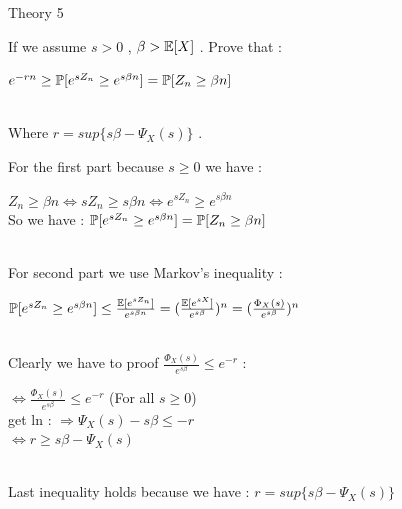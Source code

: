 \documentclass[30pt]{article}
\begin{document}
{\Large \color{blue} Theory 5 } \\
{\color{blue} If we assume $s > 0 $ , $\beta > \Bbb{E}[X] $ . Prove that : \\
\begin{center}
    $ e^{-rn} \ge \Bbb{P}[e^{sZ_n} \ge e^{s\beta n}] = \Bbb{P}[Z_n \ge \beta n] $
\end{center} \\
Where $r = sup\{s\beta - \Psi_X(s)\} $ . 
\\ } \newline 
For the first part because $s \ge 0 $ we have : \\
\begin{center}
    $Z_n \ge \beta n \Longleftrightarrow sZ_n \ge s\beta n \Longleftrightarrow e^{sZ_n} \ge e^{s\beta n} $ \vspace{.25cm} \\
    So we have :  $ \Bbb{P}[e^{sZ_n} \ge e^{s\beta n}] = \Bbb{P}[Z_n \ge \beta n] $
\end{center} \\
For second part we use Markov's inequality : \\ 
\begin{center}
    $\Bbb{P}[e^{sZ_n} \ge e^{s\beta n}] \le \frac{\Bbb{E}[e^{sZ_n}]}{e^{s\beta n}} = (\frac{\Bbb{E}[e^{sX}]}{e^{s\beta}})^n = (\frac{\Phi_X(s)}{e^{s\beta }})^n $
\end{center} \\ 
Clearly we have to proof $\frac{\Phi_X(s)}{e^{s\beta }} \le e^{-r} $ : \\
\begin{center}
    $\Longleftrightarrow \frac{\Phi_X(s)}{e^{s\beta }} \le e^{-r} $ \hspace{.3cm} (For all $s \ge 0$) \vspace{.25cm} \\ 
    get ln : $\Rightarrow \Psi_X(s) - s\beta \le -r  $ \vspace{0.25cm} \\
    $ \Longleftrightarrow r \ge s\beta - \Psi_X(s) $
\end{center} \\
Last inequality holds because we have : \hspace{0.5cm} $r = sup\{s\beta - \Psi_X(s)\} $ \\ \newline
\end{document}
